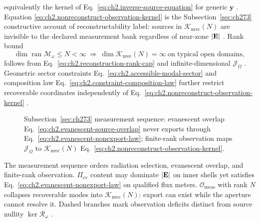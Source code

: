equivalently the kernel of Eq.~\eqref{eq:ch2.inverse-source-equation} for generic
\(\mathbf{y}\) \cite{stratton1941}. Equation
\eqref{eq:ch2.nonreconstruct-observation-kernel} is the Subsection~\ref{sec:ch273} constructive account of
reconstructability label: sources in \(\mathcal{K}_{\mathrm{nrec}}(N)\) are invisible to the
declared measurement bank regardless of near-zone \(|\mathbf{E}|\) \cite{stratton1941}. Rank bound
\begin{equation}
\label{eq:ch2.reconstructability-rank-law}
\dim\operatorname{ran}\mathcal{M}_\omega
\le
N
<
\infty
\ \Longrightarrow\
\dim\mathcal{K}_{\mathrm{nrec}}(N)=\infty
\ \text{on typical open domains},
\end{equation}
follows from Eq.~\eqref{eq:ch2.reconstruction-rank-cap} and infinite-dimensional
\(\mathcal{J}_\Omega\) \cite{stratton1941}. Geometric sector constraints
Eq.~\eqref{eq:ch2.accessible-modal-sector} and composition law
Eq.~\eqref{eq:ch2.constraint-composition-law} further restrict recoverable coordinates
independently of Eq.~\eqref{eq:ch2.nonreconstruct-observation-kernel}
\cite{stratton1941}.
\begin{figure}[t]
\centering
{}
\caption{Subsection~\ref{sec:ch273} measurement sequence: evanescent overlap
Eq.~\eqref{eq:ch2.evanescent-source-overlap} never exports through
Eq.~\eqref{eq:ch2.evanescent-nonexport-law}; finite-rank observation maps
\(\mathcal{J}_\Omega\) to \(\mathcal{K}_{\mathrm{nrec}}(N)\)
Eq.~\eqref{eq:ch2.nonreconstruct-observation-kernel}.}
\label{fig:ch2.evanescent-nonreconstruct-measurement chain}
\end{figure}
The measurement sequence orders radiation selection, evanescent overlap, and finite-rank observation. $\Pi_{\mathrm{ev}}$ content may dominate $|\mathbf{E}|$ on inner shells yet satisfies Eq.~\eqref{eq:ch2.evanescent-nonexport-law} on qualified flux meters. $\mathcal{O}_{\mathrm{meas}}$ with rank $N$ collapses recoverable modes into $\mathcal{K}_{\mathrm{nrec}}(N)$: export can exist while the aperture cannot resolve it. Dashed branches mark observation deficits distinct from source nullity $\ker\mathcal{R}_\omega$ \cite{stratton1941}. \label{thm:ch2.evanescent-nonreconstructability}
